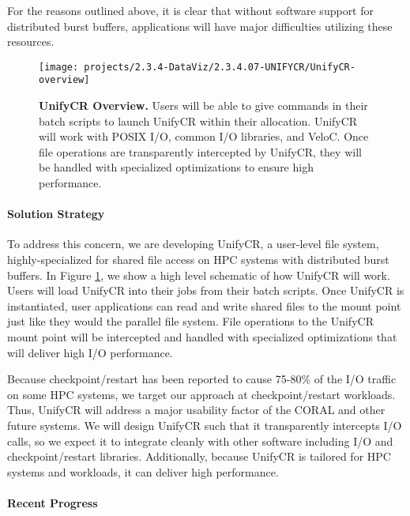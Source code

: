 For the reasons outlined above, it is clear that without software support 
for distributed burst buffers, applications
will have major difficulties utilizing these resources. 

\begin{figure}[htb]
        \centering
        \texttt{[image: projects/2.3.4-DataViz/2.3.4.07-UNIFYCR/UnifyCR-overview]}
        \caption{\label{fig:unifycr-overview} \textbf{UnifyCR Overview.} Users will be able to give commands in their batch scripts to launch UnifyCR within
their allocation. UnifyCR will work with POSIX I/O, common I/O libraries, and
VeloC. Once file operations are transparently intercepted by UnifyCR, they
will be handled with specialized optimizations to ensure high performance.}
\end{figure}

\paragraph{Solution Strategy}

To address this concern, we are developing UnifyCR, a user-level file system,
highly-specialized for shared file access on HPC systems with distributed
burst buffers. In Figure \ref{fig:unifycr-overview}, we show a high
level schematic of how UnifyCR will work. Users will load UnifyCR into
their jobs from their batch scripts. Once UnifyCR is instantiated, user
applications can read and write shared files to the mount point just like
they would the parallel file system. File operations to the UnifyCR
mount point will be intercepted and handled with specialized optimizations
that will deliver high I/O performance. 

Because checkpoint/restart has been reported to cause 75-80\%
of the I/O traffic on some HPC systems, we target our approach at
checkpoint/restart workloads. Thus, UnifyCR will address a major usability
factor of the CORAL and other future systems. We will design UnifyCR such
that it transparently intercepts I/O calls, so we expect it to integrate
cleanly with other software including I/O and checkpoint/restart libraries.
Additionally, because UnifyCR is tailored for HPC systems and workloads,
it can deliver high performance.



\paragraph{Recent Progress}

